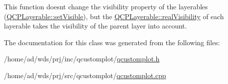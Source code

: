 This function doesn\textquotesingle{}t change the visibility property of the layerables (\hyperlink{class_q_c_p_layerable_a3bed99ddc396b48ce3ebfdc0418744f8}{Q\+C\+P\+Layerable\+::set\+Visible}), but the \hyperlink{class_q_c_p_layerable_a30809f7455e9794bca7b6c737622fa63}{Q\+C\+P\+Layerable\+::real\+Visibility} of each layerable takes the visibility of the parent layer into account. 

The documentation for this class was generated from the following files\+:\begin{DoxyCompactItemize}
\item 
/home/ad/wds/prj/inc/qcustomplot/\hyperlink{qcustomplot_8h}{qcustomplot.\+h}\item 
/home/ad/wds/prj/src/qcustomplot/\hyperlink{qcustomplot_8cpp}{qcustomplot.\+cpp}\end{DoxyCompactItemize}
